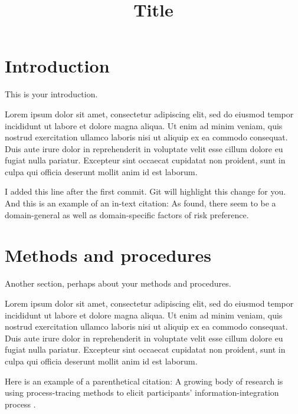 \documentclass[jou, floatsintext, colorlinks=true, linkcolor=blue, citecolor=blue, urlcolor=blue]{apa7} %
\title{Title}
\begin{document}
\maketitle

\section{Introduction}

This is your introduction.

Lorem ipsum dolor sit amet, consectetur adipiscing elit, sed do eiusmod tempor incididunt ut labore et dolore magna aliqua. Ut enim ad minim veniam, quis nostrud exercitation ullamco laboris nisi ut aliquip ex ea commodo consequat. Duis aute irure dolor in reprehenderit in voluptate velit esse cillum dolore eu fugiat nulla pariatur. Excepteur sint occaecat cupidatat non proident, sunt in culpa qui officia deserunt mollit anim id est laborum.

I added this line after the first commit. Git will highlight this change for you. And this is an example of an in-text citation: As \textcite{freyRiskPreferenceShares2017} found, there seem to be a domain-general as well as domain-specific factors of risk preference.


\section{Methods and procedures}

Another section, perhaps about your methods and procedures.

Lorem ipsum dolor sit amet, consectetur adipiscing elit, sed do eiusmod tempor incididunt ut labore et dolore magna aliqua. Ut enim ad minim veniam, quis nostrud exercitation ullamco laboris nisi ut aliquip ex ea commodo consequat. Duis aute irure dolor in reprehenderit in voluptate velit esse cillum dolore eu fugiat nulla pariatur. Excepteur sint occaecat cupidatat non proident, sunt in culpa qui officia deserunt mollit anim id est laborum.

Here is an example of a parenthetical citation: A growing body of research is using process-tracing methods to elicit participants' information-integration process \parencite[e.g.,][]{steinerWindowMyMind2021}.
\end{document}
